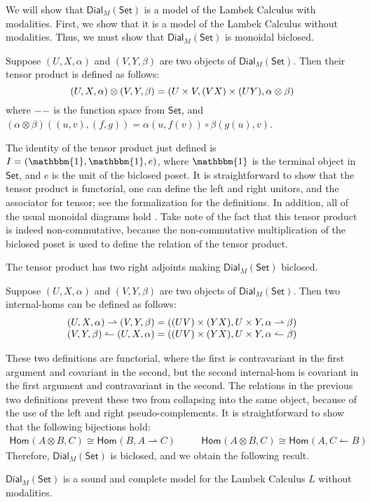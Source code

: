 \documentclass{entcs}
\let\to\relax                   %
\newcommand{\to}{\rightarrow}
\newcommand{\rto}{\leftharpoonup}
\newcommand{\lto}{\rightharpoonup}
\newcommand{\Set}{\mathsf{Set}}
\newcommand{\Dial}[2]{\mathsf{Dial}_{#1}(#2)}
\newcommand{\Hom}[3]{\mathsf{Hom}_{#1}(#2,#3)}
\begin{document}
We will show that $\Dial{M}{\Set}$ is a model of the Lambek Calculus with
modalities.  First, we show that it is a model of the Lambek Calculus
without modalities.  Thus, we must show that $\Dial{M}{\Set}$ is
monoidal biclosed.

\begin{definition}
  \label{def:dial-monoidal-structure}
  Suppose $(U, X, \alpha)$ and $(V, Y, \beta)$ are two objects of
  $\Dial{M}{\Set}$. Then their tensor product is defined as follows:
  \[
  (U, X, \alpha) \otimes (V, Y, \beta) = (U \times V, (V \to X) \times (U \to Y), \alpha \otimes \beta)
  \]
  where $- \to -$ is the function space from $\Set$, and $(\alpha
  \otimes \beta)((u, v), (f, g)) = \alpha(u, f(v)) \circ \beta(g(u), v)$.
\end{definition}

\noindent
The identity of the tensor product just defined is $I = (\mathbbm{1},
\mathbbm{1}, e)$, where $\mathbbm{1}$ is the terminal object in
$\Set$, and $e$ is the unit of the biclosed poset.  It is
straightforward to show that the tensor product is functorial, one can
define the left and right unitors, and the associator for tensor; see
the formalization for the definitions.  In addition, all of the usual
monoidal diagrams hold \cite{depaiva1990}.  Take note of the fact that
this tensor product is indeed non-commutative, because the
non-commutative multiplication of the biclosed poset is used to define
the relation of the tensor product.

The tensor product has two right adjoints making $\Dial{M}{\Set}$
biclosed.
\begin{definition}
  \label{def:dial-is-biclosed}
  Suppose $(U, X, \alpha)$ and $(V, Y, \beta)$ are two objects of
  $\Dial{M}{\Set}$. Then two internal-homs can be defined as follows:
  \[
  \begin{array}{lll}
    (U, X, \alpha) \lto (V, Y, \beta) = ((U \to V) \times (Y \to X), U \times Y, \alpha \lto \beta)\\
    (V, Y, \beta) \rto (U, X, \alpha) = ((U \to V) \times (Y \to X), U \times Y, \alpha \rto \beta)\\
  \end{array}
  \]
\end{definition}
These two definitions are functorial, where the first is contravariant
in the first argument and covariant in the second, but the second
internal-hom is covariant in the first argument and contravariant in
the second.  The relations in the previous two definitions prevent
these two from collapsing into the same object, because of the use of
the left and right pseudo-complements. It is straightforward to show
that the following bijections hold:
\[
\begin{array}{lll}
  \Hom{}{A \otimes B}{C} \cong \Hom{}{B}{A \lto C} & \quad &  \Hom{}{A \otimes B}{C} \cong \Hom{}{A}{C \rto B}
\end{array}
\]
Therefore, $\Dial{M}{\Set}$ is biclosed, and we obtain the following
result.
\begin{thm}
  \label{thm:sound-lambek}
  $\Dial{M}{\Set}$ is a sound and complete model for the Lambek
  Calculus $L$ without modalities.
\end{thm}
\end{document}
